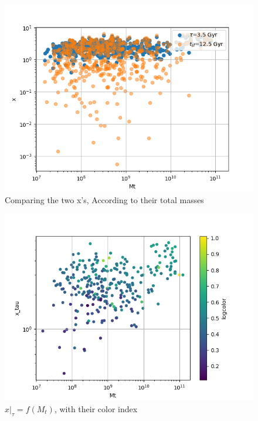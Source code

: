 \documentclass[a4paper,twocolumn]{article}
\begin{document}
\begin{figure}[htbp]
\centering
\includegraphics[width=.9\linewidth]{./figs/Comparing_the_x_Mt.png}
\caption{\label{fig:Comparing the two x's, According to their total masses}Comparing the two x's, According to their total masses}
\end{figure}
\begin{figure}[htbp]
\centering
\includegraphics[width=.9\linewidth]{./figs/x_tau-Mt-color.png}
\caption{\label{fig:$x|_\tau=f(M_t)$, with their color index}\(x|_\tau=f(M_t)\), with their color index}
\end{figure}
\end{document}
